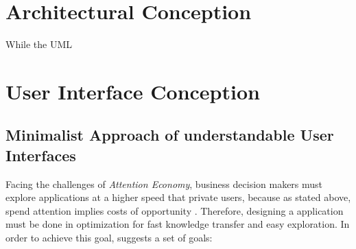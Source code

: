 \section{Architectural Conception}
While the UML \parencite[cf.]{}
\subsection{}


\section{User Interface Conception}


\subsection{Minimalist Approach of understandable User Interfaces}
Facing the challenges of \textit{Attention Economy}, business decision makers must explore applications at a higher speed that private users, because as stated above, spend attention implies costs of opportunity \parencite[cf.][]{Bakar.2017}. Therefore, designing a application must be done in optimization for fast knowledge transfer and easy exploration. In order to achieve this goal, \textcite{Bakar.2017} suggests a set of goals:
